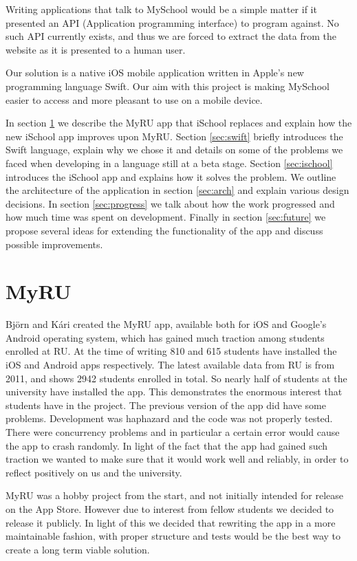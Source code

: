 \documentclass[pdftex, DIV=calc, paper=a4, fontsize=11pt]{scrartcl}	 %
\begin{document}
Writing applications that talk to MySchool would be a simple matter if it presented an API
(Application programming interface) to program against. No such API currently exists, and thus
we are forced to extract the data from the website as it is presented to a human user.

Our solution is a native iOS\cite{ios} mobile application written in Apple's new programming language Swift\cite{swift}.
Our aim with this project is making MySchool easier to access and more pleasant to use on a mobile
device.

In section \ref{sec:myru} we describe the MyRU app that iSchool replaces and explain how the new iSchool
app improves upon MyRU. Section \ref{sec:swift} briefly introduces the Swift language, explain why we chose it
and details on some of the problems we faced when developing in a language still at a beta stage. Section
\ref{sec:ischool} introduces the iSchool app and explains how it solves the problem. We outline
the architecture of the application in section \ref{sec:arch} and explain various design decisions.
In section \ref{sec:progress} we talk about how the work progressed and how much time was spent on
development. Finally in section \ref{sec:future} we propose several ideas for extending the
functionality of the app and discuss possible improvements.

\section{MyRU}
\label{sec:myru}

Björn and Kári created the MyRU app, available both for iOS and Google's Android
operating system\cite{android}, which has gained much traction among students enrolled at RU. At the time of writing 810 
and 615 students have installed the iOS and Android apps respectively. The latest available data 
from RU is from 2011, and shows 2942 students enrolled in total\cite{students}. So nearly half of students at the 
university have installed the app. This demonstrates the enormous interest that students have
in the project.
The previous version of the app did have some problems. Development was haphazard and the code was not
properly tested. There were concurrency problems and in particular a certain error would
cause the app to crash randomly. In light of the fact that the app had gained such traction we 
wanted to make sure that it would work well and reliably, in order to reflect positively on us and
the university.

MyRU was a hobby project from the start, and not initially intended for release on the App Store.
However due to interest from fellow students we decided to release it publicly.
In light of this we decided that rewriting the app in a more maintainable fashion, with proper structure and tests
would be the best way to create a long term viable solution.
\end{document}
